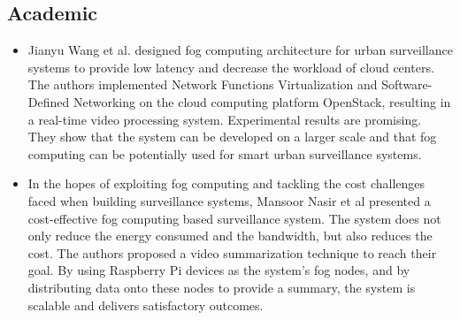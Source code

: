 \documentclass[12pt]{article}
\begin{document}
\subsection{Academic}
\begin{itemize}
\item Jianyu Wang et al. \cite{wang2017elastic} designed fog computing architecture for urban surveillance systems to provide low latency and decrease the workload of cloud centers. The authors implemented Network Functions Virtualization and Software-Defined Networking on the cloud computing platform OpenStack, resulting in a real-time video processing system. Experimental results are promising. They show that the system can be developed on a larger scale and that fog computing can be potentially used for smart urban surveillance systems. 

\item In the hopes of exploiting fog computing and tackling the cost challenges faced when building surveillance systems, Mansoor Nasir et al \cite{nasir2019fog} presented a cost-effective fog computing based surveillance system. The system does not only reduce the energy consumed and the bandwidth, but also reduces the cost. The authors proposed a video summarization technique to reach their goal. By using Raspberry Pi devices as the system’s fog nodes, and by distributing data onto these nodes to provide a summary, the system is scalable and delivers satisfactory outcomes.


\end{itemize}
\end{document}
